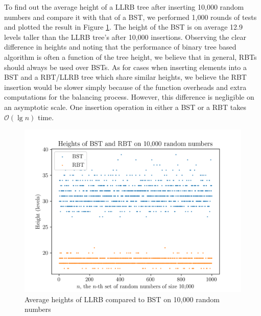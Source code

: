 \documentclass[titlepage, 12pt]{article}
\begin{document}
To find out the average height of a LLRB tree after inserting 10,000 random
numbers and compare it with that of a BST, we performed 1,000 rounds of tests
and plotted the result in Figure \ref{fig:rand}. The height of the BST is on
average 12.9 levels taller than the LLRB tree's after 10,000 insertions.
Observing the clear difference in heights and noting that the performance of
binary tree based algorithm is often a function of the tree height, we believe
that in general, RBTs should always be used over BSTs. As for cases when
inserting elements into a BST and a RBT/LLRB tree which share similar heights,
we believe the RBT insertion would be slower simply because of the function
overheads and extra computations for the balancing process. However, this
difference is negligible on an asymptotic scale. One insertion operation in
either a BST or a RBT takes \(\mathcal{O}(\lg{n})\) time.
\begin{figure}[h]
  \centering
  \includegraphics[width=0.8\linewidth]{rand} 
  \caption{Average heights of LLRB compared to BST on 10,000 random numbers}
  \label{fig:rand}
\end{figure}
\end{document}
